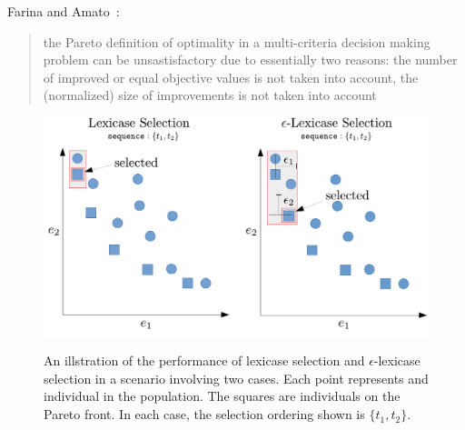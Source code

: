 \documentclass[preprint]{article}
\begin{document}
Farina and Amato~\cite{farina_optimal_2002}: \begin{quote}
the Pareto definition of optimality in a multi-criteria decision making problem can be unsastisfactory due to essentially two reasons: the number of improved or equal objective values is not taken into account, the (normalized) size of improvements is not taken into account
\end{quote}
\begin{figure}
\centering
  \includegraphics[width = \textwidth]{figs/lex_pareto.pdf}\\
  \caption{An illstration of the performance of lexicase selection and $\epsilon$-lexicase selection in a scenario involving two cases. Each point represents and individual in the population. The squares are individuals on the Pareto front. In each case, the selection ordering shown is $\{t_1,t_2\}$. }\label{fig:boxplot_eps_e}
\end{figure}
\end{document}
